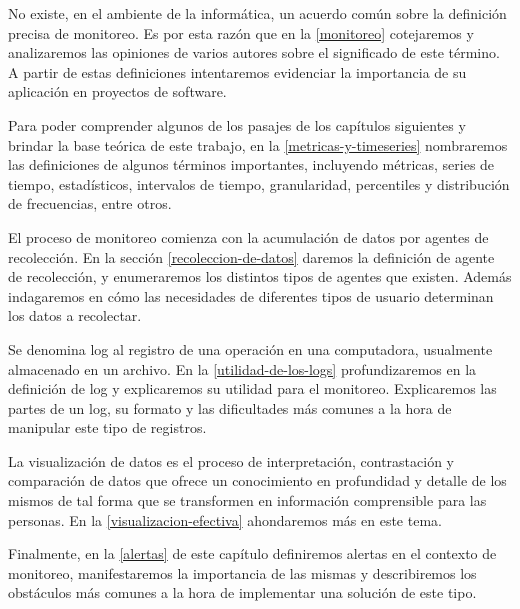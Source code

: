 No existe, en el ambiente de la informática, un acuerdo común sobre la
definición precisa de monitoreo. Es por esta razón que en la \autoref{monitoreo}
cotejaremos y analizaremos las opiniones de varios autores sobre el significado
de este término. A partir de estas definiciones intentaremos evidenciar la
importancia de su aplicación en proyectos de software.

Para poder comprender algunos de los pasajes de los capítulos siguientes y
brindar la base teórica de este trabajo, en la \autoref{metricas-y-timeseries}
nombraremos las definiciones de algunos términos importantes, incluyendo
métricas, series de tiempo, estadísticos, intervalos de tiempo, granularidad,
percentiles y distribución de frecuencias, entre otros.

El proceso de monitoreo comienza con la acumulación de datos por agentes de
recolección. En la sección \autoref{recoleccion-de-datos} daremos la definición
de agente de recolección, y enumeraremos los distintos tipos de agentes que
existen. Además indagaremos en cómo las necesidades de diferentes tipos de
usuario determinan los datos a recolectar.

Se denomina log al registro de una operación en una computadora, usualmente
almacenado en un archivo. En la \autoref{utilidad-de-los-logs} profundizaremos
en la definición de log y explicaremos su utilidad para el monitoreo.
Explicaremos las partes de un log, su formato y las dificultades más comunes a
la hora de manipular este tipo de registros.

La visualización de datos es el proceso de interpretación, contrastación y
comparación de datos que ofrece un conocimiento en profundidad y detalle de
los mismos de tal forma que se transformen en información comprensible para las
personas. En la \autoref{visualizacion-efectiva} ahondaremos más en este tema.

Finalmente, en la \autoref{alertas} de este capítulo definiremos alertas en el
contexto de monitoreo, manifestaremos la importancia de las mismas y
describiremos los obstáculos más comunes a la hora de implementar una solución
de este tipo.
